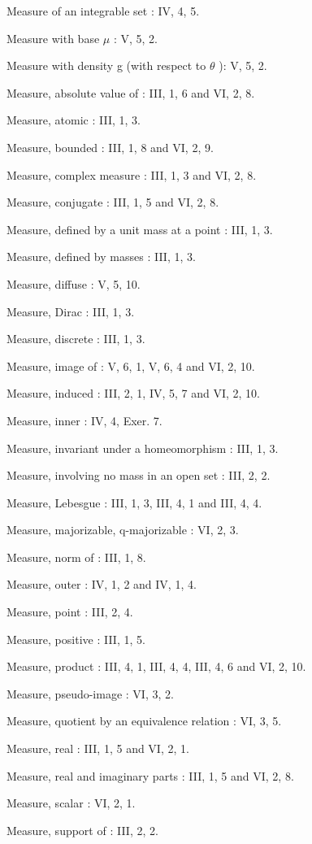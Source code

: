 Measure of an integrable set : IV, 4, 5.

Measure with base \(\mu\) : V, 5, 2.

Measure with density g (with respect to \(\theta\) ): V, 5, 2.

Measure, absolute value of : III, 1, 6 and VI, 2, 8.

Measure, atomic : III, 1, 3.

Measure, bounded : III, 1, 8 and VI, 2, 9.

Measure, complex measure : III, 1, 3 and VI, 2, 8.

Measure, conjugate : III, 1, 5 and VI, 2, 8.

Measure, defined by a unit mass at a point : III, 1, 3.

Measure, defined by masses : III, 1, 3.

Measure, diffuse : V, 5, 10.

Measure, Dirac : III, 1, 3.

Measure, discrete : III, 1, 3.

Measure, image of : V, 6, 1, V, 6, 4 and VI, 2, 10.

Measure, induced : III, 2, 1, IV, 5, 7 and VI, 2, 10.

Measure, inner : IV, 4, Exer. 7.

Measure, invariant under a homeomorphism : III, 1, 3.

Measure, involving no mass in an open set : III, 2, 2.

Measure, Lebesgue : III, 1, 3, III, 4, 1 and III, 4, 4.

Measure, majorizable, q-majorizable : VI, 2, 3.

Measure, norm of : III, 1, 8.

Measure, outer : IV, 1, 2 and IV, 1, 4.

Measure, point : III, 2, 4.

Measure, positive : III, 1, 5.

Measure, product : III, 4, 1, III, 4, 4, III, 4, 6 and VI, 2, 10.

Measure, pseudo-image : VI, 3, 2.

Measure, quotient by an equivalence relation : VI, 3, 5.

Measure, real : III, 1, 5 and VI, 2, 1.

Measure, real and imaginary parts : III, 1, 5 and VI, 2, 8.

Measure, scalar : VI, 2, 1.

Measure, support of : III, 2, 2.

